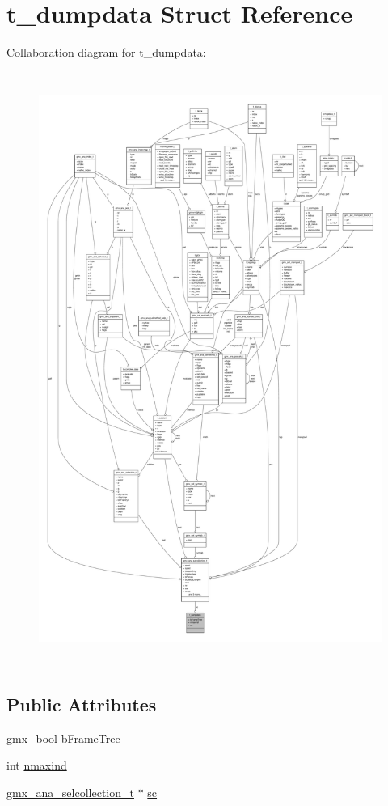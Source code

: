 \hypertarget{structt__dumpdata}{\section{t\-\_\-dumpdata \-Struct \-Reference}
\label{structt__dumpdata}
}


\-Collaboration diagram for t\-\_\-dumpdata\-:
\nopagebreak
\begin{figure}[H]
\begin{center}
\leavevmode
\includegraphics[height=550pt]{structt__dumpdata__coll__graph}
\end{center}
\end{figure}
\subsection*{\-Public \-Attributes}
\begin{DoxyCompactItemize}
\item 
\hyperlink{include_2types_2simple_8h_a8fddad319f226e856400d190198d5151}{gmx\-\_\-bool} \hyperlink{structt__dumpdata_a0363a5efa9cc9cc56862bff662784219}{b\-Frame\-Tree}
\item 
int \hyperlink{structt__dumpdata_a28faf06ec85500c8252d4d3526db69ae}{nmaxind}
\item 
\hyperlink{structgmx__ana__selcollection__t}{gmx\-\_\-ana\-\_\-selcollection\-\_\-t} $\ast$ \hyperlink{structt__dumpdata_ae7f557e75dd65fd0be9e56c9dbe1f162}{sc}
\end{DoxyCompactItemize}


